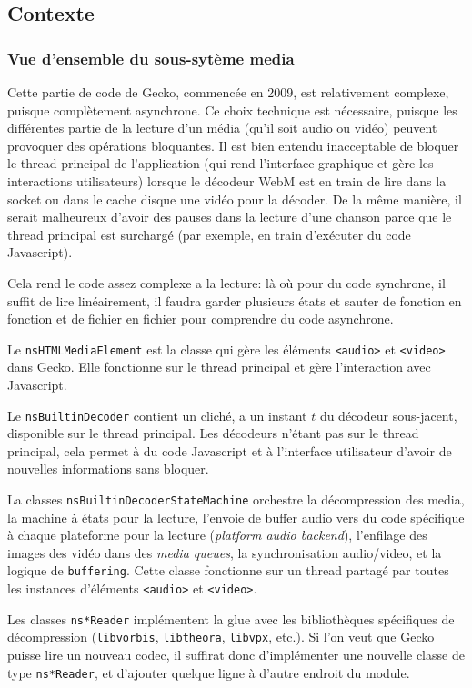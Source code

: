 \documentclass[a4paper,10pt]{article}
\newcommand{\cc}[1]{\texttt{#1}}
\begin{document}
\begin{multicols}{2}
  \part{Contexte}
  \section{Vue d'ensemble du sous-sytème media}
  Cette partie de code de Gecko, commencée en 2009, est relativement complexe,
  puisque complètement asynchrone. Ce choix technique est nécessaire, puisque
  les différentes partie de la lecture d'un média (qu'il soit audio ou vidéo)
  peuvent provoquer des opérations bloquantes. Il est bien entendu inacceptable
  de bloquer le thread principal de l'application (qui rend l'interface
  graphique et gère les interactions utilisateurs) lorsque le décodeur WebM est
  en train de lire dans la socket ou dans le cache disque une vidéo pour la
  décoder. De la même manière, il serait malheureux d'avoir des pauses dans la
  lecture d'une chanson parce que le thread principal est surchargé (par
  exemple, en train d'exécuter du code Javascript).

  Cela rend le code assez complexe a la lecture: là où pour du code synchrone,
  il suffit de lire linéairement, il faudra garder plusieurs états et sauter de
  fonction en fonction et de fichier en fichier pour comprendre du code
  asynchrone.

  Le \cc{nsHTMLMediaElement} est la classe qui gère les éléments \cc{<audio>} et
  \cc{<video>} dans Gecko. Elle fonctionne sur le thread principal et gère
  l'interaction avec Javascript.

  Le \cc{nsBuiltinDecoder} contient un cliché, a un instant $t$ du décodeur
  sous-jacent, disponible sur le thread principal.  Les décodeurs n'étant pas
  sur le thread principal, cela permet à du code Javascript et à l'interface
  utilisateur d'avoir de nouvelles informations sans bloquer.

  La classes \cc{nsBuiltinDecoderStateMachine} orchestre la décompression des
  media, la machine à états pour la lecture, l'envoie de buffer audio vers du
  code spécifique à chaque plateforme pour la lecture (\emph{platform audio
  backend}), l'enfilage des images des vidéo dans des \emph{media queues}, la
  synchronisation audio/video, et la logique de \cc{buffering}. Cette classe
  fonctionne sur un thread partagé par toutes les instances d'éléments
  \cc{<audio>} et \cc{<video>}.

  Les classes \cc{ns*Reader} implémentent la glue avec les bibliothèques
  spécifiques de décompression (\cc{libvorbis}, \cc{libtheora}, \cc{libvpx},
  etc.). Si l'on veut que Gecko puisse lire un nouveau codec, il suffirat donc
  d'implémenter une nouvelle classe de type \cc{ns*Reader}, et d'ajouter quelque
  ligne à d'autre endroit du module.


\end{multicols}
\end{document}
